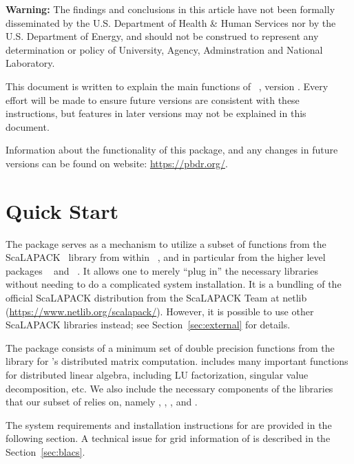 {\color{red} \bf Warning:}
The findings and conclusions in this article have not been
formally disseminated by the U.S. Department of Health \& Human Services
nor by the U.S. Department of Energy,
and should not be construed to represent any determination or
policy of University, Agency, Adminstration and National Laboratory.

This document is written to explain the main
functions of ~\citep{Chen2012pbdSLAPpackage}, version \slapversion.
Every effort will be made to ensure future versions are consistent with
these instructions, but features in later versions may not be explained
in this document.

Information about the functionality of this package,
and any changes in future versions can be found on website:
\url{https://pbdr.org/}.



\section[Quick Start]{Quick Start}
\label{sec:quick_start}

The  package serves as a mechanism to utilize a subset of
functions from the ScaLAPACK~\citep{ScaLAPACK1997} library from within
~\citep{Rcore}, and in particular from the higher level
 packages ~\citep{Schmidt2012pbdBASEpackage} and
~\citep{Schmidt2012pbdDMATpackage}. It allows one to merely
``plug in'' the necessary libraries without needing to do a complicated
system installation.  It is a bundling of the official ScaLAPACK distribution
from the ScaLAPACK Team at netlib (\url{https://www.netlib.org/scalapack/}).
However, it is possible to use other ScaLAPACK libraries instead; see
Section~\ref{sec:external} for details.

The  package consists of a minimum set of double precision
functions from the  library
for 's distributed matrix computation. 
includes many important functions for distributed linear algebra, including
LU factorization, singular value decomposition, etc.
We also include the necessary components of the libraries that our subset of
 relies on, namely ,
, , and .  

The system requirements and installation instructions for  are
provided in the following section.
A technical issue for grid information of  is described in
the Section~\ref{sec:blacs}.


